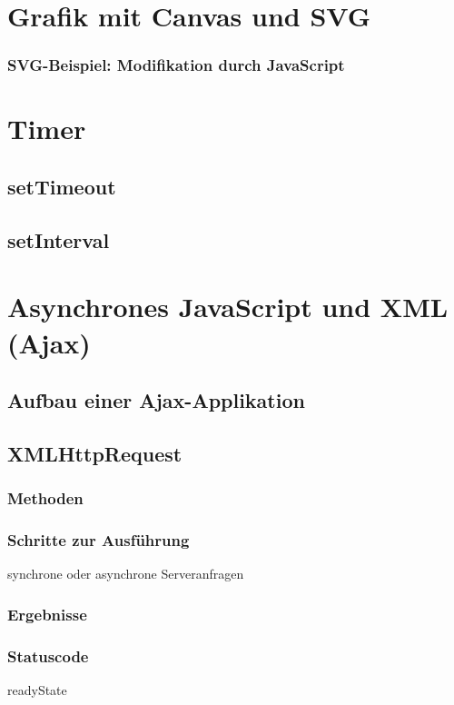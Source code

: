 \section{Grafik mit Canvas und SVG}
\subsubsection*{SVG-Beispiel: Modifikation durch JavaScript}

\section{Timer}
\subsection{setTimeout}
\subsection{setInterval}

\section{Asynchrones JavaScript und XML (Ajax)}
\subsection{Aufbau einer Ajax-Applikation}
\subsection{XMLHttpRequest}
\subsubsection{Methoden}
\subsubsection{Schritte zur Ausführung}
synchrone oder asynchrone Serveranfragen
\subsubsection{Ergebnisse}
\subsubsection{Statuscode}
readyState
